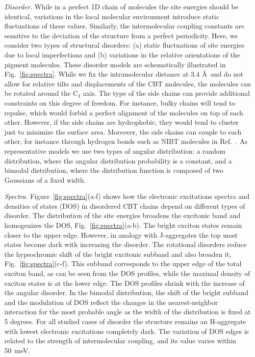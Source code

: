\documentclass[journal=jacs,manuscript=article]{achemso}
\begin{document}
\textit{Disorder.} While in a perfect 1D chain of molecules the site energies should be identical, variations in the local molecular environment introduce static fluctuations of these values.  Similarly, the intermolecular coupling constants are sensitive to the deviation of the structure from a perfect periodicity.  Here, we consider two types of structural disorders: (a) static fluctuations of site energies due to local imperfections and (b) variations in the relative orientations of the pigment molecules. These disorder models are schematically illustrated in Fig.~\ref{fig:spectra}. While we fix the intramolecular distance at $3.4$ \AA\ and do not allow for relative tilts and displacements of the CBT molecules, the molecules can be rotated around the C$_3$ axis. The type of the side chains can provide additional constraints on this degree of freedom. For instance, bulky chains will tend to repulse, which would forbid a perfect alignment of the molecules on top of each other. However, if the side chains are hydrophobic, they would tend to cluster just to minimize the surface area. Moreover, the side chains can couple to each other, for instance through hydrogen bonds such as NIBT molecules in Ref.~\cite{Haedler2015}. As representative models we use two types of angular distribution: a random distribution, where the angular distribution probability is a constant, and a bimodal distribution, where the distribution function is composed of two Gaussians of a fixed width.

\textit{Spectra.} Figure~\ref{fig:spectra}(a-f) shows how the electronic excitations spectra and densities of states (DOS) in disordered CBT chains depend on different types of disorder. The distribution of the site energies broadens the excitonic band and homogenizes the DOS, Fig.~\ref{fig:spectra}(a-b). The bright exciton states remain closer to the upper edge. However, in analogy with J-aggregates the top most states become dark with increasing the disorder. The rotational disorders reduce the hypsochromic shift of the bright excitonic subband and also broaden it, Fig.~\ref{fig:spectra}(c-f). This subband corresponds to the upper edge of the total exciton band, as can be seen from the DOS profiles, while the maximal density of exciton states is at the lower edge. The DOS profiles shrink with the increase of the angular disorder. In the bimodal distribution, the shift of the bright subband and the modulation of DOS reflect the changes in the nearest-neighbor interaction for the most probable angle as the width of the distribution is fixed at 5 degrees. For all studied cases of disorder the structure remains an H-aggregate with lowest electronic excitations completely dark. The variation of DOS edges is related to the strength of intermolecular coupling, and its value varies within 50~meV.
\end{document}
